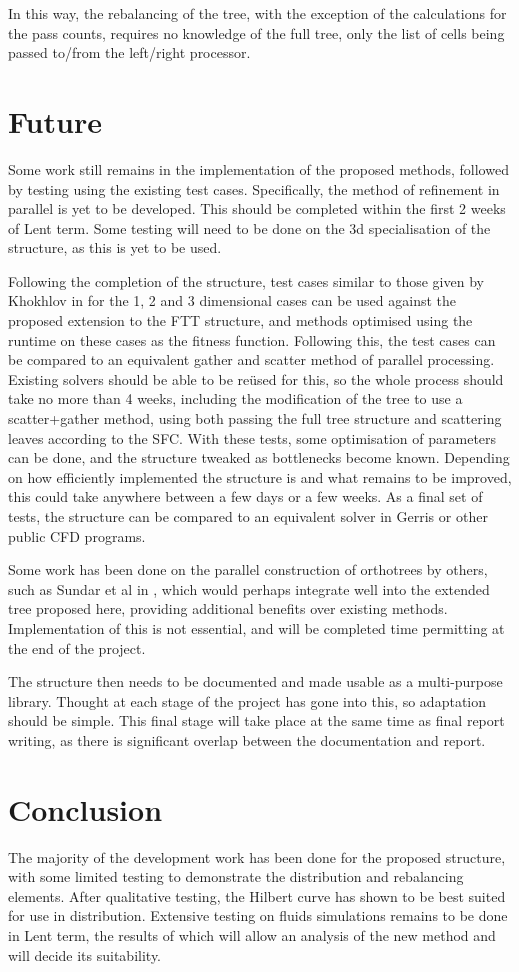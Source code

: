 \documentclass[12pt]{article}
\begin{document}
In this way, the rebalancing of the tree, with the exception of the calculations for the pass counts, requires no knowledge of the full tree, only the list of cells being passed to/from the left/right processor. 

\section{Future}
Some work still remains in the implementation of the proposed methods, followed by testing using the existing test cases. Specifically, the method of refinement in parallel is yet to be developed. This should be completed within the first 2 weeks of Lent term. Some testing will need to be done on the 3d specialisation of the structure, as this is yet to be used. 

Following the completion of the structure, test cases similar to those given by Khokhlov in \cite{Khokhlov98} for the 1, 2 and 3 dimensional cases can be used against the proposed extension to the FTT structure, and methods optimised using the runtime on these cases as the fitness function. Following this, the test cases can be compared to an equivalent gather and scatter method of parallel processing. Existing solvers should be able to be re\"used for this, so the whole process should take no more than 4 weeks, including the modification of the tree to use a scatter+gather method, using both passing the full tree structure and scattering leaves according to the SFC. With these tests, some optimisation of parameters can be done, and the structure tweaked as bottlenecks become known. Depending on how efficiently implemented the structure is and what remains to be improved, this could take anywhere between a few days or a few weeks. As a final set of tests, the structure can be compared to an equivalent solver in Gerris or other public CFD programs. 

Some work has been done on the parallel construction of orthotrees by others, such as Sundar et al in \cite{sundar2008}, which would perhaps integrate well into the extended tree proposed here, providing additional benefits over existing methods. Implementation of this is not essential, and will be completed time permitting at the end of the project.

The structure then needs to be documented and made usable as a multi-purpose library. Thought at each stage of the project has gone into this, so adaptation should be simple. This final stage will take place at the same time as final report writing, as there is significant overlap between the documentation and report. 

\section{Conclusion}
The majority of the development work has been done for the proposed structure, with some limited testing to demonstrate the distribution and rebalancing elements. After qualitative testing, the Hilbert curve has shown to be best suited for use in distribution. Extensive testing on fluids simulations remains to be done in Lent term, the results of which will allow an analysis of the new method and will decide its suitability. 


\printbibliography
\end{document}
